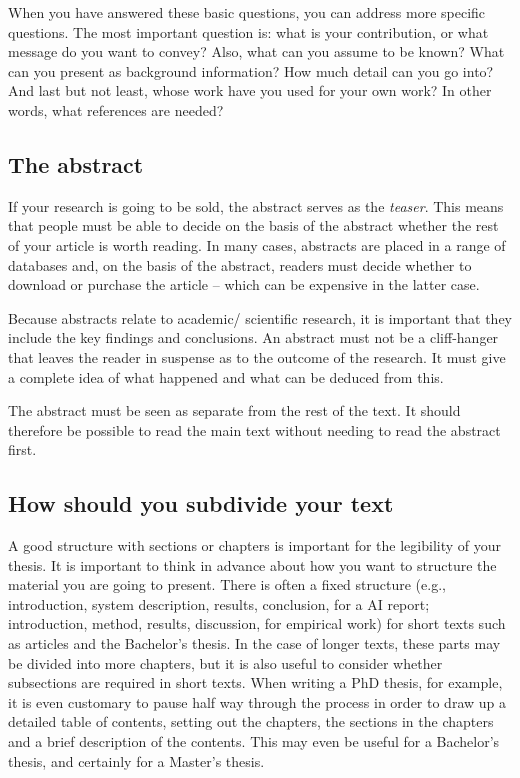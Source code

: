 When you have answered these basic questions, you can address more specific questions.
The most important question is: what is your contribution, or what message do you want to convey?
Also, what can you assume to be known? What can you present as background information? How much detail can you go into? And last but not least, whose work have you used for your own work? In other words, what references are needed?

\subsection{The abstract}\label{sec:_the_abstract}
If your research is going to be sold, the abstract serves as the \textit{teaser}.
This means that people must be able to decide on the basis of the abstract whether the rest of your article is worth reading.
In many cases, abstracts are placed in a range of databases and, on the basis of the abstract, readers must decide whether to download or purchase the article – which can be expensive in the latter case.

Because abstracts relate to academic/ scientific research, it is important that they include the key findings and conclusions.
An abstract must not be a cliff-hanger that leaves the reader in suspense as to the outcome of the research.
It must give a complete idea of what happened and what can be deduced from this.

The abstract must be seen as separate from the rest of the text.
It should therefore be possible to read the main text without needing to read the abstract first.

\subsection{How should you subdivide your text}\label{sec:_subdivide_text}
A good structure with sections or chapters is important for the legibility of your thesis.
It is important to think in advance about how you want to structure the material you are going to present.
There is often a fixed structure (e.g., introduction, system description, results, conclusion, for a AI report; introduction, method, results, discussion, for empirical work) for short texts such as articles and the Bachelor's thesis.
In the case of longer texts, these parts may be divided into more chapters, but it is also useful to consider whether subsections are required in short texts.
When writing a PhD thesis, for example, it is even customary to pause half way through the process in order to draw up a detailed table of contents, setting out the chapters, the sections in the chapters and a brief description of the contents.
This may even be useful for a Bachelor's thesis, and certainly for a Master's thesis.

